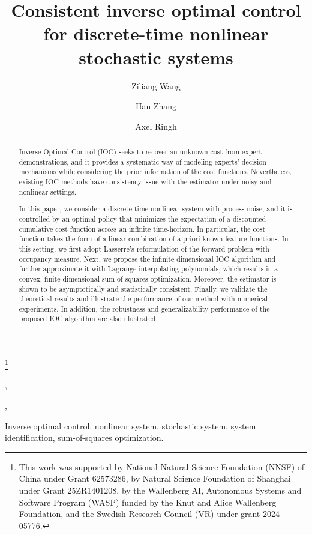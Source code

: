\documentclass[twocolumn]{autart}
\numberwithin{theorem}{section}
\begin{document}
\begin{frontmatter}
  \title{Consistent inverse optimal control\\ for discrete-time nonlinear stochastic systems}

  \thanks[footnoteinfo]{This work was supported by National Natural Science Foundation (NNSF) of China under Grant 62573286, by Natural Science Foundation of Shanghai under Grant 25ZR1401208, by the Wallenberg AI, Autonomous Systems and Software Program (WASP) funded by the Knut and Alice Wallenberg Foundation, and the Swedish Research Council (VR) under grant 2024-05776.
  }
  \author[SJTU,IMR]{Ziliang Wang},
  \author[SJTU,IMR]{Han Zhang},
  \author[CHALMERS_AND_GU]{Axel Ringh}
  
  \address[SJTU]{School of Automation and Intelligent Sensing, Shanghai Jiao Tong University, Shanghai, China}
  \address[IMR]{Institute of Medical Robotics, Shanghai Jiao Tong University, Shanghai, China}
  \address[CHALMERS_AND_GU]{Department of Mathematical Sciences, Chalmers University of Technology and University of Gothenburg, 41296 Gothenburg, Sweden}  

  \begin{keyword}
Inverse optimal control, nonlinear system, stochastic system, system identification, sum-of-squares optimization.
  \end{keyword}
  

  \begin{abstract}
    
    Inverse Optimal Control (IOC) seeks to recover an unknown cost from expert demonstrations, and it provides a systematic way of modeling experts' decision mechanisms while considering the prior information of the cost functions. Nevertheless, existing IOC methods have consistency issue with the estimator under noisy and nonlinear settings. 
    
    In this paper, we consider a discrete-time nonlinear system with process noise, and it is controlled by an optimal policy that minimizes the expectation of a discounted cumulative cost function across an infinite time-horizon.
    In particular, the cost function takes the form of a linear combination of a priori known feature functions. 
    In this setting, we first adopt Lasserre's reformulation \citep{hernandez2012discrete} of the forward problem with occupancy measure. Next, we propose the infinite dimensional IOC algorithm and further approximate it with Lagrange interpolating polynomials, which results in a convex, finite-dimensional sum-of-squares optimization. 
    Moreover, the estimator is shown to be asymptotically and statistically consistent.
    Finally, we validate the theoretical results and illustrate the performance of our method with numerical experiments. In addition, the robustness and generalizability performance of the proposed IOC algorithm are also illustrated.
  \end{abstract}


\end{frontmatter}
\end{document}
